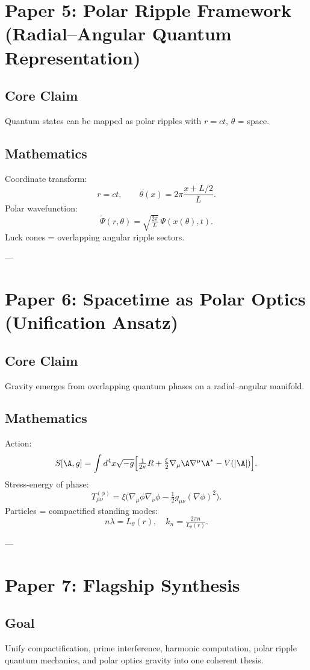 \documentclass[12pt]{article}
\begin{document}
\section{Paper 5: Polar Ripple Framework (Radial–Angular Quantum Representation)}
\subsection{Core Claim}
Quantum states can be mapped as polar ripples with $r=ct$, $\theta$ = space.  

\subsection{Mathematics}
Coordinate transform:
\[
r=ct,\qquad \theta(x)=2\pi\frac{x+L/2}{L}.
\]
Polar wavefunction:
\[
\tilde{\Psi}(r,\theta) = \sqrt{\tfrac{2\pi}{L}}\,\Psi(x(\theta),t).
\]
Luck cones = overlapping angular ripple sectors.  

---

\section{Paper 6: Spacetime as Polar Optics (Unification Ansatz)}
\subsection{Core Claim}
Gravity emerges from overlapping quantum phases on a radial–angular manifold.  

\subsection{Mathematics}
Action:
\[
S[\A,g] = \int d^4x \sqrt{-g}\Big[ \tfrac{1}{2\kappa}R + \tfrac{\xi}{2}\nabla_\mu \A\nabla^\mu \A^* - V(|\A|)\Big].
\]
Stress-energy of phase:
\[
T_{\mu\nu}^{(\phi)}=\xi\big(\nabla_\mu \phi\nabla_\nu \phi - \tfrac{1}{2}g_{\mu\nu}(\nabla \phi)^2\big).
\]
Particles = compactified standing modes:
\[
n\lambda = L_\theta(r), \quad k_n=\tfrac{2\pi n}{L_\theta(r)}.
\]

---

\section{Paper 7: Flagship Synthesis}
\subsection{Goal}
Unify compactification, prime interference, harmonic computation, polar ripple quantum mechanics, and polar optics gravity into one coherent thesis.  
\end{document}
